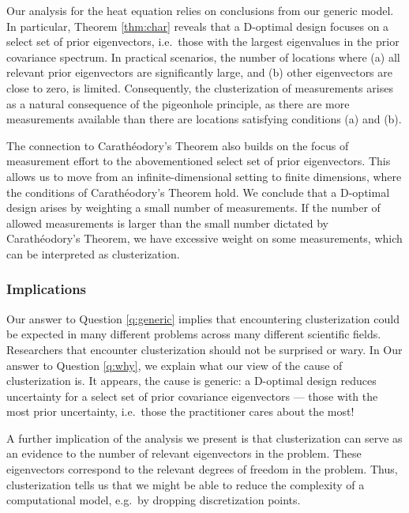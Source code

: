 \begin{enumerate}
  Our analysis for the heat equation relies on conclusions from our
  generic model. In particular, Theorem \ref{thm:char} reveals that a
  D-optimal design focuses on a select set of prior eigenvectors,
  i.e.~those with the largest eigenvalues in the prior covariance
  spectrum. In practical scenarios, the number of locations where (a)
  all relevant prior eigenvectors are significantly large, and (b)
  other eigenvectors are close to zero, is limited. Consequently, the
  clusterization of measurements arises as a natural consequence of
  the pigeonhole principle, as there are more measurements available
  than there are locations satisfying conditions (a) and (b).

  The connection to Carath\'eodory's Theorem also builds on the focus
  of measurement effort to the abovementioned select set of prior
  eigenvectors. This allows us to move from an infinite-dimensional
  setting to finite dimensions, where the conditions of
  Carath\'eodory's Theorem hold. We conclude that a D-optimal design
  arises by weighting a small number of measurements. If the number of
  allowed measurements is larger than the small number dictated by
  Carath\'eodory's Theorem, we have excessive weight on some
  measurements, which can be interpreted as clusterization.
  
\end{enumerate}

\subsubsection{Implications}\label{subsub:implications}
Our answer to Question \ref{q:generic} implies that encountering
clusterization could be expected in many different problems across
many different scientific fields. Researchers that encounter
clusterization should not be surprised or wary. In Our answer to
Question \ref{q:why}, we explain what our view of the cause of
clusterization is. It appears, the cause is generic: a D-optimal
design reduces uncertainty for a select set of prior covariance
eigenvectors --- those with the most prior uncertainty, i.e.~those the
practitioner cares about the most!

A further implication of the analysis we present is that
clusterization can serve as an evidence to the number of relevant
eigenvectors in the problem. These eigenvectors correspond to the
relevant degrees of freedom in the problem. Thus, clusterization tells
us that we might be able to reduce the complexity of a computational
model, e.g.~by dropping discretization points.

